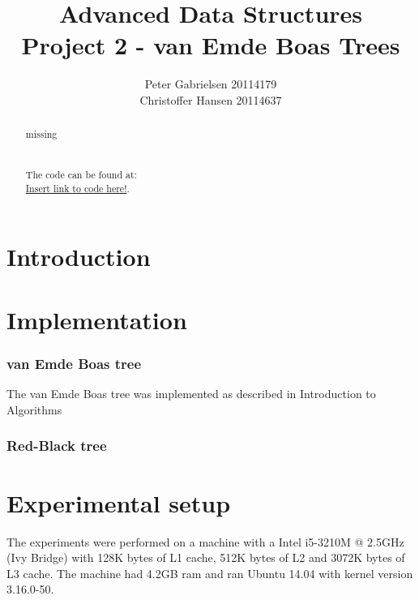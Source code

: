 \documentclass[a4paper,oneside,article,11pt]{memoir}
\title{Advanced Data Structures \\ Project 2 - van Emde Boas Trees}
\author{Peter Gabrielsen 20114179 \\
Christoffer Hansen 20114637}
\begin{document}
\begin{titlingpage}
\clearpage

\maketitle
\thispagestyle{empty}

\begin{abstract}
missing
\\
\\
\\
The code can be found at: \\\url{Insert link to code here!}.
\end{abstract}
\end{titlingpage}

\pagebreak

\tableofcontents

\pagebreak

\chapter{Introduction}


\chapter{Implementation}
\label{cpt:implementation}


\subsection{van Emde Boas tree}
The van Emde Boas tree was implemented as described in Introduction to Algorithms~\cite{clrs}

\subsection{Red-Black tree}


\chapter{Experimental setup}
\label{chtp:experiment_setup}

The experiments were performed on a machine with a Intel i5-3210M @ 2.5GHz (Ivy Bridge) with 128K bytes of L1 cache, 512K bytes of L2 and 3072K bytes of L3 cache. The machine had 4.2GB ram and ran Ubuntu 14.04 with kernel version 3.16.0-50.
\end{document}
